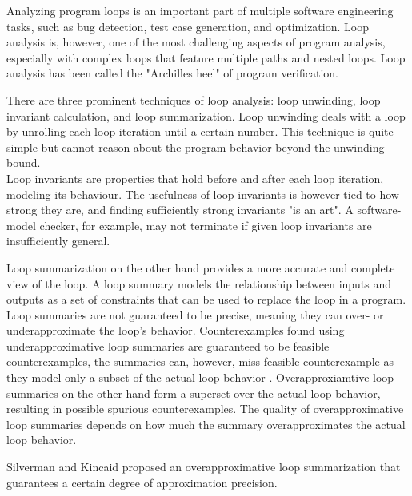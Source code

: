
Analyzing program loops is an important part of multiple software engineering tasks, such as bug detection, test case generation, and optimization. Loop analysis is, however, one of the most challenging aspects of program analysis, especially with complex loops that feature multiple paths and nested loops. Loop analysis has been called the "Archilles heel" of program verification\cite{0.1007/s10703-012-0176-y}. \par
There are three prominent techniques of loop analysis: loop unwinding, loop invariant calculation, and loop summarization\cite{0.1007/s10703-012-0176-y, 8241837,10.1007/978-3-030-25543-5_7}. Loop unwinding deals with a loop by unrolling each loop iteration until a certain number. This technique is quite simple but cannot reason about the program behavior beyond the unwinding bound. \\
Loop invariants are properties that hold before and after each loop iteration, modeling its behaviour. The usefulness of loop invariants is however tied to how strong they are, and finding sufficiently strong invariants "is an art"\cite{0.1007/s10703-012-0176-y}. A software-model checker, for example, may not terminate if given loop invariants are insufficiently general. \par
Loop summarization on the other hand provides a more accurate and complete view of the loop. A loop summary models the relationship between inputs and outputs as a set of constraints that can be used to replace the loop in a program. Loop summaries are not guaranteed to be precise, meaning they can over- or underapproximate the loop's behavior. Counterexamples found using underapproximative loop summaries are guaranteed to be feasible counterexamples, the summaries can, however, miss feasible counterexample as they model only a subset of the actual loop behavior \cite{10.1007/s10703-015-0228-1}. Overapproxiamtive loop summaries on the other hand form a superset over the actual loop behavior, resulting in possible spurious counterexamples. The quality of overapproximative loop summaries depends on how much the summary overapproximates the actual loop behavior.\par
{}
Silverman and Kincaid\cite{10.1007/978-3-030-25543-5_7} proposed an overapproximative loop summarization that guarantees a certain degree of approximation precision.\par 
